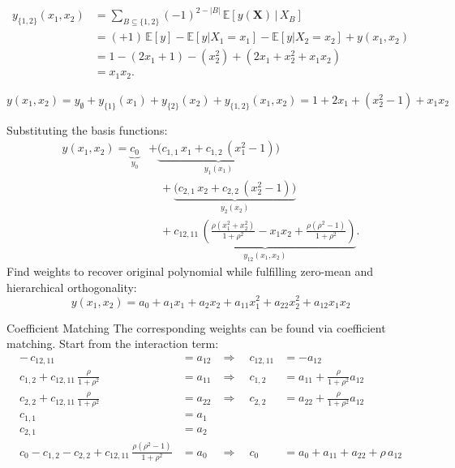 \begin{frame}
  \begin{align*}
    y_{\{1,2\}}(x_1,x_2)
    &= \sum_{B \subseteq \{1,2\}} (-1)^{2-|B|}
       \,\mathbb{E}[y(\boldsymbol{X})\,|\,X_B] \\[2pt]
    &= (+1)\,\mathbb{E}[y] 
     - \mathbb{E}[y|X_1=x_1]
     - \mathbb{E}[y|X_2=x_2]
     + y(x_1,x_2) \\[2pt]
    &= 1 - (2x_1+1) - (x_2^2) + (2x_1+x_2^2+x_1x_2) \\[2pt]
    &= x_1 x_2.
\end{align*}

\[
y(x_1,x_2)
= y_{\emptyset} + y_{\{1\}}(x_1) + y_{\{2\}}(x_2) + y_{\{1,2\}}(x_1,x_2)
= 1 + 2x_1 + (x_2^2 - 1) + x_1 x_2
\]

\end{frame}



\begin{frame}
  Substituting the basis functions:
  \begin{align*}
   y(x_1,x_2)  = \underbrace{c_0}_{y_0}
   &+ \underbrace{\big(c_{1,1}\,x_1 
                     + c_{1,2}\,(x_1^2 - 1)\big)}_{y_1(x_1)} \\[0.5em]
   &\quad
   + \underbrace{\big(c_{2,1}\,x_2 
                     + c_{2,2}\,(x_2^2 - 1)\big)}_{y_2(x_2)} \\[0.5em]
   &\quad
   + \underbrace{c_{12,11}\,\left(\frac{\rho (x_1^2 + x_2^2)}{1 + \rho^2} 
                         - x_1 x_2 
                         + \frac{\rho(\rho^2 - 1)}{1 + \rho^2}\right)}_{y_{12}(x_1,x_2)}.
\end{align*}
Find weights to recover original polynomial while fulfilling zero-mean and hierarchical orthogonality:
\[
y(x_1,x_2) = a_0 + a_1 x_1 + a_2 x_2 
   + a_{11} x_1^2 + a_{22} x_2^2 + a_{12} x_1 x_2 
\]

\end{frame}

\begin{frame}{Coefficient Matching}
  The corresponding weights can be found via coefficient matching. Start from the interaction term:
      \begin{align*}
-\,c_{12, 11} &= a_{12} &\Rightarrow\quad c_{12, 11} &= -a_{12} \\[0.5em]
c_{1,2} + c_{12, 11}\,\tfrac{\rho}{1+\rho^2} &= a_{11} 
&\Rightarrow\quad c_{1,2} &= a_{11} + \tfrac{\rho}{1+\rho^2}a_{12} \\[0.5em]
c_{2,2} + c_{12, 11}\,\tfrac{\rho}{1+\rho^2} &= a_{22} 
&\Rightarrow\quad c_{2,2} &= a_{22} + \tfrac{\rho}{1+\rho^2}a_{12} \\[0.5em]
c_{1,1} &= a_1 \\[0.5em]
c_{2,1} &= a_2 \\[0.5em]
c_0 - c_{1,2} - c_{2,2} + c_{12, 11}\,\tfrac{\rho(\rho^2 - 1)}{1+\rho^2} &= a_0 
&\Rightarrow\quad 
c_0 &= a_0 + a_{11} + a_{22} + \rho\,a_{12}
\end{align*}
\end{frame}

